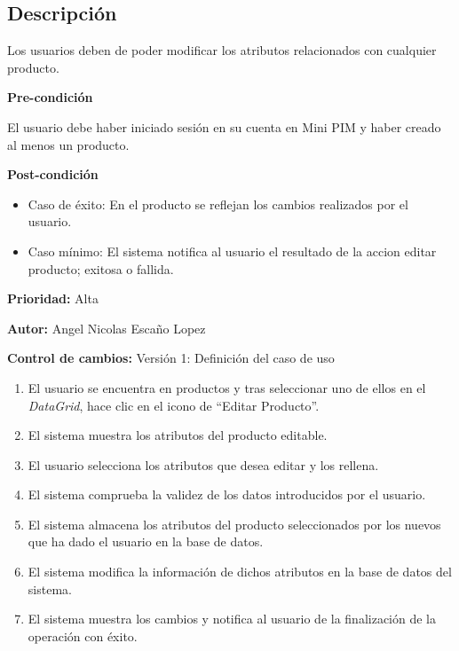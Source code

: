 
\subsection*{Descripción}
Los usuarios deben de poder modificar los atributos relacionados con cualquier producto.\par
\vspace{0.15cm}

\textbf{Pre-condición}\par
El usuario debe haber iniciado sesión en su cuenta en Mini PIM y haber creado al menos un producto.\par
\vspace{0.15cm}

\textbf{Post-condición}
\begin{itemize}
    \item Caso de éxito: En el producto se reflejan los cambios realizados por el usuario.
    \item Caso mínimo: El sistema notifica al usuario el resultado de la accion editar producto; exitosa o fallida.
\end{itemize}

\textbf{Prioridad: }
Alta
\vspace{0.15cm}

\textbf{Autor: }
Angel Nicolas Escaño Lopez\par
\vspace{0.15cm}

\textbf{Control de cambios: } Versión 1: Definición del caso de uso

\begin{enumerate}
    \item El usuario se encuentra en productos y tras seleccionar uno de ellos en el \textit{DataGrid}, hace clic en el icono de \enquote{Editar Producto}.
    \item El sistema muestra los atributos del producto editable.
    \item El usuario selecciona los atributos que desea editar y los rellena.
    \item El sistema comprueba la validez de los datos introducidos por el usuario.
    \item El sistema almacena los atributos del producto seleccionados por los nuevos que ha dado el usuario en la base de datos.
    \item El sistema modifica la información de dichos atributos en la base de datos del sistema.
    \item El sistema muestra los cambios y notifica al usuario de la finalización de la operación con éxito.
\end{enumerate}

